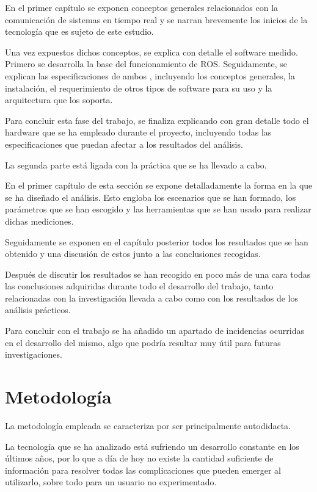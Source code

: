 \documentclass[a4paper,11pt,spanish]{sphinxmanual}
\begin{document}
\sphinxAtStartPar
En el primer capítulo se exponen conceptos generales relacionados con
la comunicación de sistemas en tiempo real y se narran brevemente los inicios
de la tecnología que es sujeto de este estudio.

\sphinxAtStartPar
Una vez expuestos dichos conceptos, se explica con detalle
el software medido. Primero se desarrolla la base del funcionamiento de
ROS. Seguidamente, se
explican las especificaciones de ambos , incluyendo los conceptos
generales, la instalación, el requerimiento de otros tipos de software para
su uso y la arquitectura que los soporta.

\sphinxAtStartPar
Para concluir esta fase del trabajo, se finaliza explicando con gran
detalle todo el hardware que se ha empleado durante el proyecto, incluyendo
todas las especificaciones que puedan afectar a los resultados
del análisis.

\sphinxAtStartPar
La segunda parte está ligada con la práctica que se ha llevado a cabo.

\sphinxAtStartPar
En el primer capítulo de esta sección se expone detalladamente la forma
en la que se ha diseñado el análisis. Esto engloba los escenarios que se han
formado, los parámetros que se han escogido y las herramientas que se han
usado para realizar dichas mediciones.

\sphinxAtStartPar
Seguidamente se exponen en el capítulo posterior todos los resultados
que se han obtenido y una discusión de estos junto a las conclusiones
recogidas.

\sphinxAtStartPar
Después de discutir los resultados se han recogido en poco más de una cara
todas las conclusiones adquiridas durante todo el desarrollo del trabajo,
tanto relacionadas con la investigación llevada a cabo como con los resultados
de los análisis prácticos.

\sphinxAtStartPar
Para concluir con el trabajo se ha añadido un apartado de incidencias ocurridas
en el desarrollo del mismo, algo que podría resultar muy útil para futuras investigaciones.


\section{Metodología}
\label{\detokenize{introduccion:metodologia}}
\sphinxAtStartPar
La metodología empleada se caracteriza por ser principalmente autodidacta.

\sphinxAtStartPar
La tecnología que se ha analizado está sufriendo un desarrollo constante
en los últimos años, por lo que a día de hoy no existe la cantidad suficiente
de información para resolver todas las complicaciones que pueden emerger
al utilizarlo, sobre todo para un usuario no experimentado.
\end{document}
